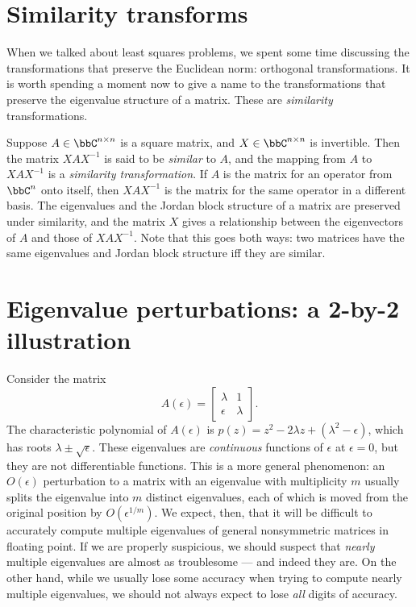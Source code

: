 \documentclass[12pt, leqno]{article} %
\begin{document}

\section{Similarity transforms}

When we talked about least squares problems, we spent some time
discussing the transformations that preserve the Euclidean norm:
orthogonal transformations.  It is worth spending a moment now to give
a name to the transformations that preserve the eigenvalue structure
of a matrix.  These are {\em similarity} transformations.

Suppose $A \in \bbC^{n \times n}$ is a square matrix, and $X \in
\bbC^{n \times n}$ is invertible.  Then the matrix $X A X^{-1}$ is
said to be {\em similar} to $A$, and the mapping from $A$ to $X A
X^{-1}$ is a {\em similarity transformation}.  If $A$ is the matrix for
an operator from $\bbC^n$ onto itself, then $X A X^{-1}$ is the matrix
for the same operator in a different basis.  The eigenvalues and the
Jordan block structure of a matrix are preserved under similarity, and
the matrix $X$ gives a relationship between the eigenvectors of $A$
and those of $X A X^{-1}$.  Note that this goes both ways: two
matrices have the same eigenvalues and Jordan block structure iff they
are similar.

\section{Eigenvalue perturbations: a 2-by-2 illustration}

Consider the matrix
\[
  A(\epsilon) =
  \begin{bmatrix}
     \lambda & 1 \\
    \epsilon & \lambda
  \end{bmatrix}.
\]
The characteristic polynomial of $A(\epsilon)$ is $p(z) = z^2 -
2\lambda z + (\lambda^2-\epsilon)$, which has roots $\lambda \pm
\sqrt{\epsilon}$.  These eigenvalues are {\em continuous} functions of
$\epsilon$ at $\epsilon = 0$, but they are not differentiable
functions.  This is a more general phenomenon: an $O(\epsilon)$
perturbation to a matrix with an eigenvalue with multiplicity $m$
usually splits the eigenvalue into $m$ distinct eigenvalues, each of
which is moved from the original position by $O(\epsilon^{1/m})$.  We
expect, then, that it will be difficult to accurately compute multiple
eigenvalues of general nonsymmetric matrices in floating point.  If we
are properly suspicious, we should suspect that {\em nearly} multiple
eigenvalues are almost as troublesome --- and indeed they are.  On the
other hand, while we usually lose some accuracy when trying to compute
nearly multiple eigenvalues, we should not always expect to lose
{\em all} digits of accuracy.
\end{document}
